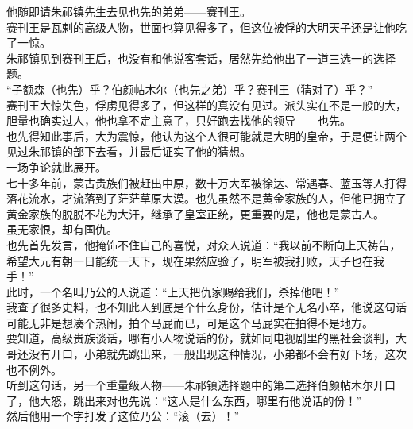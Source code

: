 \begin{multicols}{\theparacolNo}
他随即请朱祁镇先生去见也先的弟弟——赛刊王。\\

赛刊王是瓦剌的高级人物，世面也算见得多了，但这位被俘的大明天子还是让他吃了一惊。\\

朱祁镇见到赛刊王后，也没有和他说客套话，居然先给他出了一道三选一的选择题。\\

“子额森（也先）乎？伯颜帖木尔（也先之弟）乎？赛刊王（猜对了）乎？”\\

赛刊王大惊失色，俘虏见得多了，但这样的真没有见过。派头实在不是一般的大，胆量也确实过人，他也拿不定主意了，只好跑去找他的领导——也先。\\

也先得知此事后，大为震惊，他认为这个人很可能就是大明的皇帝，于是便让两个见过朱祁镇的部下去看，并最后证实了他的猜想。\\

一场争论就此展开。\\

七十多年前，蒙古贵族们被赶出中原，数十万大军被徐达、常遇春、蓝玉等人打得落花流水，才流落到了茫茫草原大漠。也先虽然不是黄金家族的人，但他已拥立了黄金家族的脱脱不花为大汗，继承了皇室正统，更重要的是，他也是蒙古人。\\

虽无家恨，却有国仇。\\

也先首先发言，他掩饰不住自己的喜悦，对众人说道：“我以前不断向上天祷告，希望大元有朝一日能统一天下，现在果然应验了，明军被我打败，天子也在我手！”\\

此时，一个名叫乃公的人说道：“上天把仇家赐给我们，杀掉他吧！”\\

我查了很多史料，也不知此人到底是个什么身份，估计是个无名小卒，他说这句话可能无非是想凑个热闹，拍个马屁而已，可是这个马屁实在拍得不是地方。\\

要知道，高级贵族谈话，哪有小人物说话的份，就如同电视剧里的黑社会谈判，大哥还没有开口，小弟就先跳出来，一般出现这种情况，小弟都不会有好下场，这次也不例外。\\

听到这句话，另一个重量级人物——朱祁镇选择题中的第二选择伯颜帖木尔开口了，他大怒，跳出来对也先说：“这人是什么东西，哪里有他说话的份！”\\

然后他用一个字打发了这位乃公：“滚（去）！”\\


\end{multicols}
